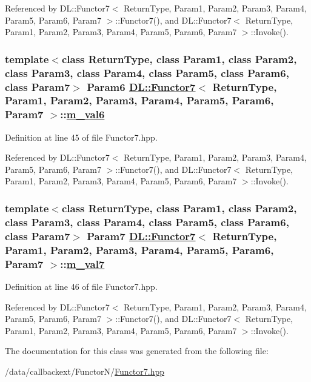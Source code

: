 Referenced by DL::Functor7$<$ Return\-Type, Param1, Param2, Param3, Param4, Param5, Param6, Param7 $>$::Functor7(), and DL::Functor7$<$ Return\-Type, Param1, Param2, Param3, Param4, Param5, Param6, Param7 $>$::Invoke().\hypertarget{classDL_1_1Functor7_r6}{
\subsubsection[m\_\-val6]{\setlength{\rightskip}{0pt plus 5cm}template$<$class Return\-Type, class Param1, class Param2, class Param3, class Param4, class Param5, class Param6, class Param7$>$ Param6 \hyperlink{classDL_1_1Functor7}{DL::Functor7}$<$ Return\-Type, Param1, Param2, Param3, Param4, Param5, Param6, Param7 $>$::\hyperlink{classDL_1_1Functor7_r6}{m\_\-val6}}}
\label{classDL_1_1Functor7_r6}




Definition at line 45 of file Functor7.hpp.

Referenced by DL::Functor7$<$ Return\-Type, Param1, Param2, Param3, Param4, Param5, Param6, Param7 $>$::Functor7(), and DL::Functor7$<$ Return\-Type, Param1, Param2, Param3, Param4, Param5, Param6, Param7 $>$::Invoke().\hypertarget{classDL_1_1Functor7_r7}{
\subsubsection[m\_\-val7]{\setlength{\rightskip}{0pt plus 5cm}template$<$class Return\-Type, class Param1, class Param2, class Param3, class Param4, class Param5, class Param6, class Param7$>$ Param7 \hyperlink{classDL_1_1Functor7}{DL::Functor7}$<$ Return\-Type, Param1, Param2, Param3, Param4, Param5, Param6, Param7 $>$::\hyperlink{classDL_1_1Functor7_r7}{m\_\-val7}}}
\label{classDL_1_1Functor7_r7}




Definition at line 46 of file Functor7.hpp.

Referenced by DL::Functor7$<$ Return\-Type, Param1, Param2, Param3, Param4, Param5, Param6, Param7 $>$::Functor7(), and DL::Functor7$<$ Return\-Type, Param1, Param2, Param3, Param4, Param5, Param6, Param7 $>$::Invoke().

The documentation for this class was generated from the following file:\begin{CompactItemize}
\item 
/data/callbackext/Functor\-N/\hyperlink{Functor7_8hpp}{Functor7.hpp}\end{CompactItemize}
